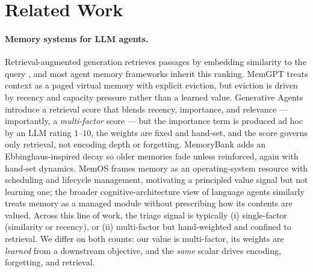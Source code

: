 \section{Related Work}
\label{sec:related}

\paragraph{Memory systems for LLM agents.}
Retrieval-augmented generation retrieves passages by embedding similarity
to the query \citep{lewis2020rag}, and most agent memory frameworks
inherit this ranking. MemGPT \citep{packer2023memgpt} treats context as a
paged virtual memory with explicit eviction, but eviction is driven by
recency and capacity pressure rather than a learned value. Generative
Agents \citep{park2023generative} introduce a retrieval score that blends
recency, importance, and relevance --- importantly, a \emph{multi-factor}
score --- but the importance term is produced ad hoc by an LLM rating
$1$--$10$, the weights are fixed and hand-set, and the score governs only
retrieval, not encoding depth or forgetting. MemoryBank
\citep{zhong2024memorybank} adds an Ebbinghaus-inspired decay so older
memories fade unless reinforced, again with hand-set dynamics. MemOS
\citep{memos2025} frames memory as an operating-system resource with
scheduling and lifecycle management, motivating a principled value signal
but not learning one; the broader cognitive-architecture view of language
agents \citep{sumers2024cogarch} similarly treats memory as a managed
module without prescribing how its contents are valued. Across this line
of work, the triage signal is typically (i) single-factor (similarity or
recency), or (ii) multi-factor but hand-weighted and confined to
retrieval. We differ on
both counts: our value is multi-factor, its weights are \emph{learned}
from a downstream objective, and the \emph{same} scalar drives encoding,
forgetting, and retrieval.

